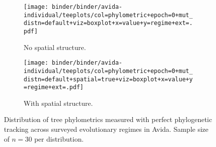 \begin{figure*}
  \centering
  \begin{subfigure}[b]{\textwidth}
    \texttt{[image: binder/binder/avida-individual/teeplots/col=phylometric+epoch=0+mut\_distn=default+viz=boxplot+x=value+y=regime+ext=.pdf]}
    \caption{No spatial structure.}
  \end{subfigure}
  \begin{subfigure}[b]{\textwidth}
  \texttt{[image: binder/binder/avida-individual/teeplots/col=phylometric+epoch=0+mut\_distn=default+spatial=true+viz=boxplot+x=value+y=regime+ext=.pdf]}
    \caption{With spatial structure.}
  \end{subfigure}
  \caption{%
    Distribution of tree phylometrics measured with perfect phylogenetic tracking across surveyed evolutionary regimes in Avida.
    Sample size of $n=30$ per distribution.
  }
  \label{fig:perfect-tree-phylometrics-avida}
\end{figure*}
